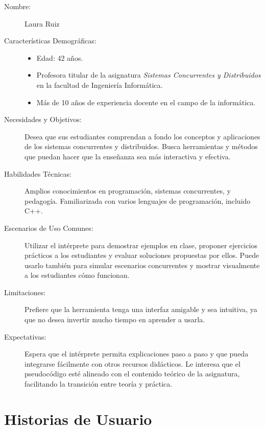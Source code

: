 \begin{description}
    \item[Nombre:] Laura Ruiz
    \item[Características Demográficas:] \hfill
        \begin{itemize}
            \item Edad: 42 años.
            \item Profesora titular de la asignatura \textit{Sistemas Concurrentes y Distribuidos} en la facultad de Ingeniería Informática.
            \item Más de 10 años de experiencia docente en el campo de la informática.
        \end{itemize}
    \item[Necesidades y Objetivos:] Desea que sus estudiantes comprendan a fondo los conceptos y aplicaciones de los sistemas concurrentes y distribuidos. Busca herramientas y métodos que puedan hacer que la enseñanza sea más interactiva y efectiva.
    
    \item[Habilidades Técnicas:] Amplios conocimientos en programación, sistemas concurrentes, y pedagogía. Familiarizada con varios lenguajes de programación, incluido C++.
    
    \item[Escenarios de Uso Comunes:] Utilizar el intérprete para demostrar ejemplos en clase, proponer ejercicios prácticos a los estudiantes y evaluar soluciones propuestas por ellos. Puede usarlo también para simular escenarios concurrentes y mostrar visualmente a los estudiantes cómo funcionan.
    
    \item[Limitaciones:] Prefiere que la herramienta tenga una interfaz amigable y sea intuitiva, ya que no desea invertir mucho tiempo en aprender a usarla. 
    
    \item[Expectativas:] Espera que el intérprete permita explicaciones paso a paso y que pueda integrarse fácilmente con otros recursos didácticos. Le interesa que el pseudocódigo esté alineado con el contenido teórico de la asignatura, facilitando la transición entre teoría y práctica.
\end{description}

\newpage

\section{Historias de Usuario}

